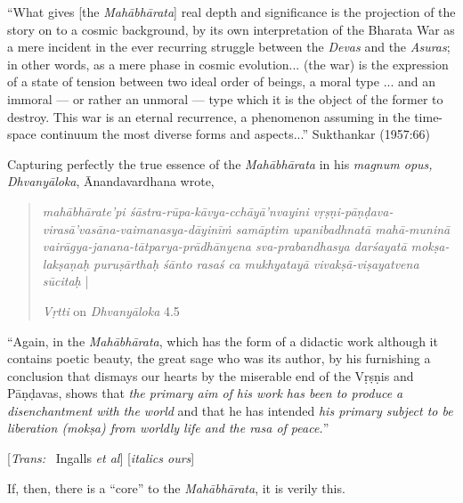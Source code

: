 \begin{myquote}
“What gives [the {\sl Mahābhārata}] real depth and significance is the projection of the story on to a cosmic background, by its own interpretation of the Bharata War as a mere incident in the ever recurring struggle between the {\sl Devas} and the {\sl Asuras}; in other words, as a mere phase in cosmic evolution... (the war) is the expression of a state of tension between two ideal order of beings, a moral type ...  and an immoral --- or rather an unmoral --- type which it is the object of the former to destroy. This war is an eternal recurrence, a phenomenon assuming in the time-space continuum the most diverse forms and aspects...” 
\hfill Sukthankar (1957:66)
\end{myquote}

Capturing perfectly the true essence of the {\sl Mahābhārata} in his {\sl magnum opus, Dhvanyāloka}, Ānandavardhana wrote, 

\begin{quote}
{{\sl mahābhārate'pi śāstra-rūpa-kāvya-cchāyā’nvayini vṛṣṇi-pāṇḍava-virasā’vasāna-vaimanasya-dāyinīṁ samāptim upanibadhnatā mahā-muninā vairāgya-janana-tātparya-prādhānyena sva-\break prabandhasya darśayatā mokṣa-lakṣaṇaḥ puruṣārthaḥ śānto rasaś ca mukhyatayā vivakṣā-viṣayatvena sūcitaḥ}} |\relax

\hfill {\sl Vṛtti} on {\sl Dhvanyāloka} 4.5
\end{quote}

\begin{myquote}
“Again, in the {\sl Mahābhārata}, which has the form of a didactic work although it contains poetic beauty, the great sage who was its author, by his furnishing a conclusion that dismays our hearts by the miserable end of the Vṛṣṇis and Pāṇḍavas, shows that {\sl the primary aim of his work has been to produce a disenchantment with the world} and that he has intended {\sl his primary subject to be liberation (mokṣa) from worldly life and the rasa of peace.}”

\hfill [{\sl Trans:}~ Ingalls {\sl et al}] [{\sl italics ours}]
\end{myquote}

If, then, there is a “core” to the {\sl Mahābhārata}, it is verily this.  

